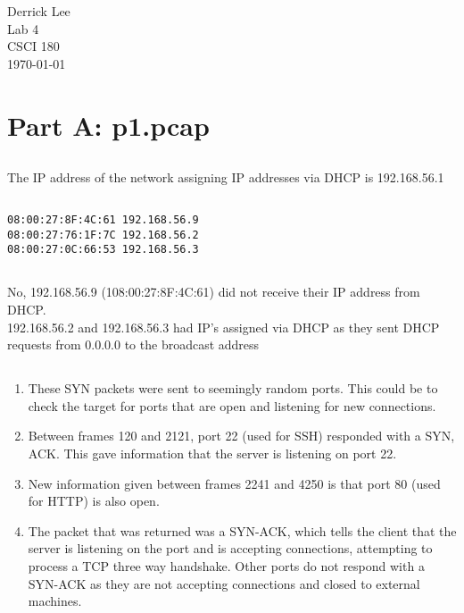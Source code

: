 \documentclass[12pt]{exam}
\begin{document}
\noindent
Derrick Lee\\
Lab 4\\
CSCI 180\\
\today\\

\section{Part A: p1.pcap}

\subsection{}

The IP address of the network assigning IP addresses via DHCP is 192.168.56.1

\subsection{}

\begin{lstlisting}
08:00:27:8F:4C:61 192.168.56.9
08:00:27:76:1F:7C 192.168.56.2
08:00:27:0C:66:53 192.168.56.3
\end{lstlisting}

\subsection{}

No, 192.168.56.9 (108:00:27:8F:4C:61) did not receive their IP address from
DHCP.\\
192.168.56.2 and 192.168.56.3 had IP's assigned via DHCP as they sent DHCP
requests from 0.0.0.0 to the broadcast address

\subsection{}

\begin{enumerate}[label=\alph*)]
    \item These SYN packets were sent to seemingly random ports.  This could be
    to check the target for ports that are open and listening for new
    connections.
    \item Between frames 120 and 2121, port 22 (used for SSH) responded with a
    SYN, ACK. This gave information that the server is listening on port 22.
    \item New information given between frames 2241 and 4250 is that port 80
    (used for HTTP) is also open.
    \item The packet that was returned was a SYN-ACK, which tells the client
    that the server is listening on the port and is accepting connections,
    attempting to process a TCP three way handshake.  Other ports do not respond
    with a SYN-ACK as they are not accepting connections and closed to external
    machines.
\end{enumerate}
\end{document}
